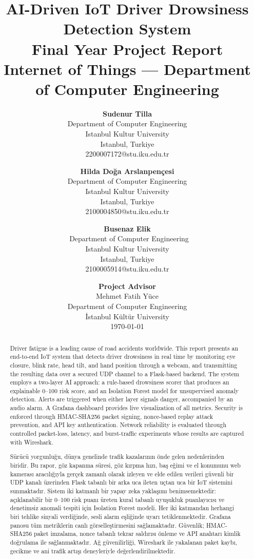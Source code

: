 \documentclass[12pt, a4paper]{article}
\title{
    \vspace{-1cm}
    \Huge\textbf{AI-Driven IoT Driver Drowsiness Detection System} \\[0.5cm]
    \large Final Year Project Report \\[0.3cm]
    \normalsize Internet of Things — Department of Computer Engineering
    \vspace{1cm}
}
\author{
    \textbf{Sudenur Tilla} \\
    \small Department of Computer Engineering \\
    \small Istanbul Kultur University \\
    \small Istanbul, Turkiye \\
    \small 2200007172@stu.iku.edu.tr \\
    \and
    \textbf{Hilda Doğa Arslanpençesi} \\
    \small Department of Computer Engineering \\
    \small Istanbul Kultur University \\
    \small Istanbul, Turkiye \\
    \small 2100004850@stu.iku.edu.tr \\
    \and
    \textbf{Busenaz Elik} \\
    \ Department of Computer Engineering \\
    \small Istanbul Kultur University \\
    \small Istanbul, Turkiye \\
    \small 2100005914@stu.iku.edu.tr \\
}
\date{
    \vspace{6cm}
    \normalsize \textbf{Project Advisor} \\[0.2cm]
    \normalsize Mehmet Fatih Yüce \\[0.2cm]
    \normalsize Department of Computer Engineering \\
    \normalsize İstanbul Kültür University \\[0.3cm]
    \today
}
\begin{document}

\maketitle
\thispagestyle{empty}
\vspace{1cm}

\newpage
\begin{abstract}
Driver fatigue is a leading cause of road accidents worldwide. This report presents
an end-to-end IoT system that detects driver drowsiness in real time by monitoring
eye closure, blink rate, head tilt, and hand position through a webcam, and
transmitting the resulting data over a secured UDP channel to a Flask-based backend.
The system employs a two-layer AI approach: a rule-based drowsiness scorer that
produces an explainable 0--100 risk score, and an Isolation Forest model for
unsupervised anomaly detection. Alerts are triggered when either layer signals
danger, accompanied by an audio alarm. A Grafana dashboard provides live
visualization of all metrics. Security is enforced through HMAC-SHA256 packet
signing, nonce-based replay attack prevention, and API key authentication.
Network reliability is evaluated through controlled packet-loss, latency, and
burst-traffic experiments whose results are captured with Wireshark.
\end{abstract}

\newpage

\renewcommand{\abstractname}{Özet}
\begin{abstract}
Sürücü yorgunluğu, dünya genelinde trafik kazalarının önde gelen nedenlerinden
biridir. Bu rapor, göz kapanma süresi, göz kırpma hızı, baş eğimi ve el
konumunu web kamerası aracılığıyla gerçek zamanlı olarak izleyen ve elde edilen
verileri güvenli bir UDP kanalı üzerinden Flask tabanlı bir arka uca ileten
uçtan uca bir IoT sistemini sunmaktadır. Sistem iki katmanlı bir yapay zeka
yaklaşımı benimsemektedir: açıklanabilir bir 0--100 risk puanı üreten kural
tabanlı uyuşukluk puanlayıcısı ve denetimsiz anomali tespiti için Isolation
Forest modeli. Her iki katmandan herhangi biri tehlike sinyali verdiğinde,
sesli alarm eşliğinde uyarı tetiklenmektedir. Grafana panosu tüm metriklerin
canlı görselleştirmesini sağlamaktadır. Güvenlik; HMAC-SHA256 paket imzalama,
nonce tabanlı tekrar saldırısı önleme ve API anahtarı kimlik doğrulama ile
sağlanmaktadır. Ağ güvenilirliği, Wireshark ile yakalanan paket kaybı, gecikme
ve ani trafik artışı deneyleriyle değerlendirilmektedir.
\end{abstract}
\end{document}
